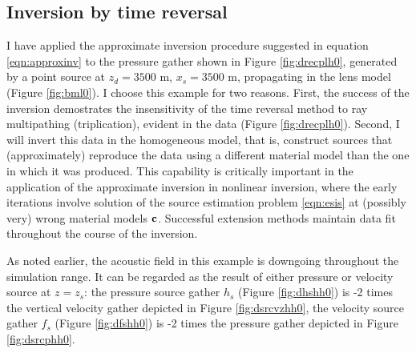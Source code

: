 


\subsection{Inversion by time reversal}
I have applied the approximate inversion procedure suggested in
equation \ref{eqn:approxinv} to the pressure gather shown in Figure
\ref{fig:drecplh0}, generated by a point source
at $z_d=3500$ m, $x_s=3500$ m, propagating in the %
lens
model (Figure \ref{fig:bml0}). I choose this example for two
reasons. First, the success of the inversion demostrates the
insensitivity of the time reversal method to ray multipathing
(triplication), evident in the data (Figure \ref{fig:drecplh0}).
Second, I will invert this data in the homogeneous model, that is,
construct sources that (approximately) reproduce the data using a
different material model than the one in which it was produced. This
capability is critically important in the application of the
approximate inversion in nonlinear inversion, where the early iterations
involve solution of the source estimation problem \ref{eqn:esis} at
(possibly very) wrong material models ${\bf c}$. Successful extension
methods maintain data fit throughout the course of the inversion.

As noted earlier, the acoustic field in this example is downgoing
throughout the simulation range. It can be
regarded as the result of either pressure or velocity source at $z=z_s$: the
pressure source gather $h_s$ (Figure \ref{fig:dhshh0})  is -2 times the
vertical velocity gather depicted in Figure \ref{fig:dsrcvzhh0}, the
velocity source gather $f_s$ (Figure \ref{fig:dfshh0}) is -2 times the
pressure gather depicted in Figure \ref{fig:dsrcphh0}.


